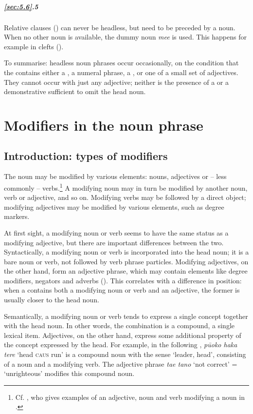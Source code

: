 \subparagraph{\ref{sec:5.6}.5} Relative clauses () can never be headless, but need to be preceded by a noun. When no other noun is available, the dummy noun \textit{me{\ꞌ}e} is used. This happens for example in clefts ().

To summarise: headless noun phrases occur occasionally, on the condition that the  contains either a , a numeral phrase, a , or one of a small set of adjectives. They cannot occur with just any adjective; neither is the presence of a  or a demonstrative sufficient to omit the head noun.

\section{Modifiers in the noun phrase}\label{sec:5.7}
\subsection{Introduction: types of modifiers}\label{sec:5.7.1}

The noun may be modified by various elements: nouns, adjectives or – less commonly – verbs.\footnote{\label{fn:265}Cf. \citet[325]{Vernaudon2011}, who gives examples of an adjective, noun and verb modifying a noun in .} A modifying noun may in turn be modified by another noun, verb or adjective, and so on. Modifying verbs may be followed by a direct object; modifying adjectives may be modified by various elements, such as degree markers.

At first sight, a modifying noun or verb seems to have the same status as a modifying adjective, but there are important differences between the two. Syntactically, a modifying noun or verb is incorporated into the head noun; it is a bare noun or verb, not followed by verb phrase particles. Modifying adjectives, on the other hand, form an adjective phrase, which may contain elements like degree modifiers, negators and adverbs (). This correlates with a difference in position: when a  contains both a modifying noun or verb and an adjective, the former is usually closer to the head noun.

Semantically, a modifying noun or verb tends to express a single concept together with the head noun. In other words, the combination is a compound, a single lexical item. Adjectives, on the other hand, express some additional property of the concept expressed by the head. For example, in the following , \textit{pū{\ꞌ}oko haka tere} ‘head \textsc{caus} run’ is a compound noun with the sense ‘leader, head’, consisting of a noun and a modifying verb. The adjective phrase \textit{ta{\ꞌ}e tano} ‘not correct’ = ‘unrighteous’ modifies this compound noun.

